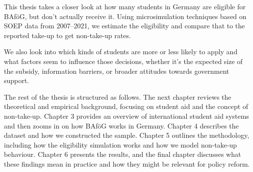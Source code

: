 This thesis takes a closer look at how many students in Germany are eligible for BAföG, but don't actually receive it. 
Using microsimulation techniques based on SOEP data from 2007--2021, we estimate the eligibility and compare that to the reported take-up to get non-take-up rates. 

We also look into which kinds of students are more or less likely to apply and what factors seem to influence those decisions, whether it’s the expected size of the subsidy, information barriers, or broader attitudes towards government support.

The rest of the thesis is structured as follows. 
The next chapter reviews the theoretical and empirical background, focusing on student aid and the concept of non-take-up. 
Chapter 3 provides an overview of international student aid systems and then zooms in on how BAföG works in Germany. 
Chapter 4 describes the dataset and how we constructed the sample. 
Chapter 5 outlines the methodology, including how the eligibility simulation works and how we model non-take-up behaviour. 
Chapter 6 presents the results, and the final chapter discusses what these findings mean in practice and how they might be relevant for policy reform.



